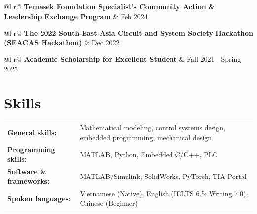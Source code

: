 \documentclass[a4paper,11pt]{article}
\begin{document}
\begin{tabularx}{\linewidth}{@{}l r@{}}
\textbf{Temasek Foundation Specialist’s Community Action \& Leadership Exchange Program} & \hfill Feb 2024 \\[3pt]
\end{tabularx}

\begin{tabularx}{\linewidth}{@{}l r@{}}
\textbf{The 2022 South-East Asia Circuit and System Society Hackathon (SEACAS Hackathon)} & \hfill Dec 2022 \\[3pt]
\end{tabularx}

\begin{tabularx}{\linewidth}{@{}l r@{}}
\textbf{Academic Scholarship for Excellent Student} & \hfill Fall 2021 - Spring 2025 \\[3pt]
\end{tabularx}

\section{Skills}

\begin{tabularx}{\linewidth}{@{}l X@{}}
\textbf{General skills:} & Mathematical modeling, control systems design, embedded programming, mechanical design \\
\textbf{Programming skills:} & MATLAB, Python, Embedded C/C++, PLC \\
\textbf{Software \& frameworks:} & MATLAB/Simulink, SolidWorks, PyTorch, TIA Portal \\
\textbf{Spoken languages:} & Vietnamese (Native), English (IELTS 6.5: Writing 7.0), Chinese (Beginner) \\
\end{tabularx}
\end{document}

